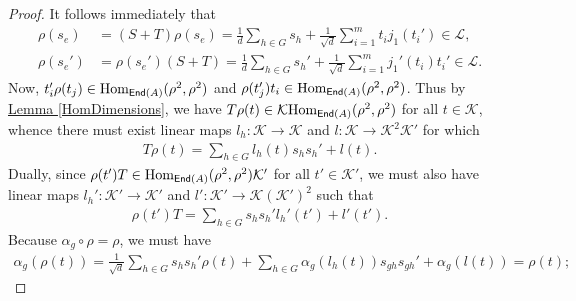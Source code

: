 \noindent\begin{proof} %
\noindent It follows immediately that
\begin{align*}
\rho(s_e) &= (S + T)\rho(s_e) = \frac{1}{d}\sum_{h \in G}s_h + \frac{1}{\sqrt{d}}\sum_{i=1}^m t_i j_1(t_i') \in \mathcal{L},\\
\rho(s_e') &= \rho(s_e')(S + T) = \frac{1}{d}\sum_{h \in G}s_h' + \frac{1}{\sqrt{d}}\sum_{i=1}^m j_1'(t_i)t_i' \in \mathcal{L}.
\end{align*}
\noindent Now, $t_i'\rho(t_j) \in \textup{Hom}_{\textup{\textsf{End}}(A)}(\rho^2, \rho^2)$ and $\rho(t_j')t_i \in \textup{Hom}_{\textup{\textsf{End}}(A)}(\rho^2, \rho^2)$. Thus by \hyperref[HomDimensions]{Lemma \ref*{HomDimensions}}, we have $T\rho(t) \in \mathcal{K}\textup{Hom}_{\textup{\textsf{End}}(A)}(\rho^2, \rho^2)$ for all $t \in \mathcal{K}$, whence there must exist linear maps $l_h : \mathcal{K} \to \mathcal{K}$ and $l : \mathcal{K} \to \mathcal{K}^2\mathcal{K}'$ for which
\begin{align*}
T\rho(t) = \sum_{h \in G} l_h(t)s_hs_h' + l(t).
\end{align*}
\noindent Dually, since $\rho(t')T \in \textup{Hom}_{\textup{\textsf{End}}(A)}(\rho^2, \rho^2)\mathcal{K}'$ for all $t' \in \mathcal{K}'$, we must also have linear maps $l_h' : \mathcal{K}' \to \mathcal{K}'$ and $l' : \mathcal{K}' \to \mathcal{K}(\mathcal{K}')^2$ such that
\begin{align*}
\rho(t')T = \sum_{h \in G} s_hs_h'l_h'(t') + l'(t').
\end{align*}
\noindent Because $\alpha_g \circ \rho = \rho$, we must have
\begin{align*}
\alpha_g(\rho(t)) = 
\frac{1}{\sqrt{d}}\sum_{h \in G}s_hs_h'\rho(t) + \sum_{h \in G}{\alpha_g(l_h(t)) s_{gh} s_{gh}'} + \alpha_g(l(t)) = \rho(t);

\end{align*}
\end{proof}
